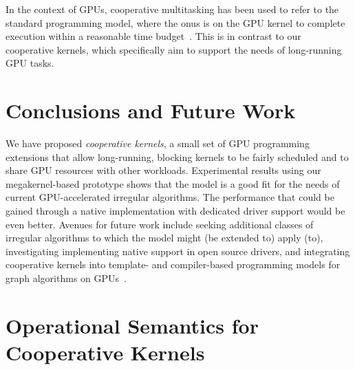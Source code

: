 \documentclass[parskip=half,sigconf,review, anonymous=true, acmcopyrightmode=none]{acmart}
\newcommand{\cutthree}[1]{}
\begin{document}
In the context of GPUs, cooperative multitasking has been used to
refer to the standard programming model, where the onus is on the GPU kernel
to complete execution within a reasonable time budget~\cite{adriaens2012case,CPE:CPE1722}.
%
This is in contrast to our cooperative kernels, which specifically aim to support the needs of long-running GPU tasks.


\section{Conclusions and Future Work}\label{sec:conclusion}

We have proposed \emph{cooperative kernels}, a small set of GPU
programming extensions that allow long-running, blocking kernels to be
fairly scheduled and to share GPU resources with other workloads.
Experimental results using our megakernel-based prototype \cutthree{over three Intel GPUs} 
shows that the model is a good fit for the needs of current
GPU-accelerated irregular algorithms.  The
performance that could be gained through a native implementation with
dedicated driver support would be even better.
%
Avenues for future work include seeking
additional classes of irregular algorithms to which the model might
(be extended to) apply (to), investigating implementing native support
in open source drivers, and integrating
cooperative kernels into template- and compiler-based programming
models for graph algorithms on
GPUs~\cite{DBLP:conf/ppopp/WangDPWRO16,DBLP:conf/oopsla/PaiP16}.

\clearpage




\iffalse


\clearpage

\appendix

\section{Operational Semantics for Cooperative Kernels}\label{appendix:semantics}

\newcommand{\myss}{\mathit{ss}}
\newcommand{\Stmts}{\mathsf{Stmts}}
\newcommand{\threadstates}{\mathsf{ThreadStates}}
\newcommand{\sharedstates}{\mathsf{SharedStates}}
\newcommand{\sync}{\mathsf{sync}}
\end{document}
